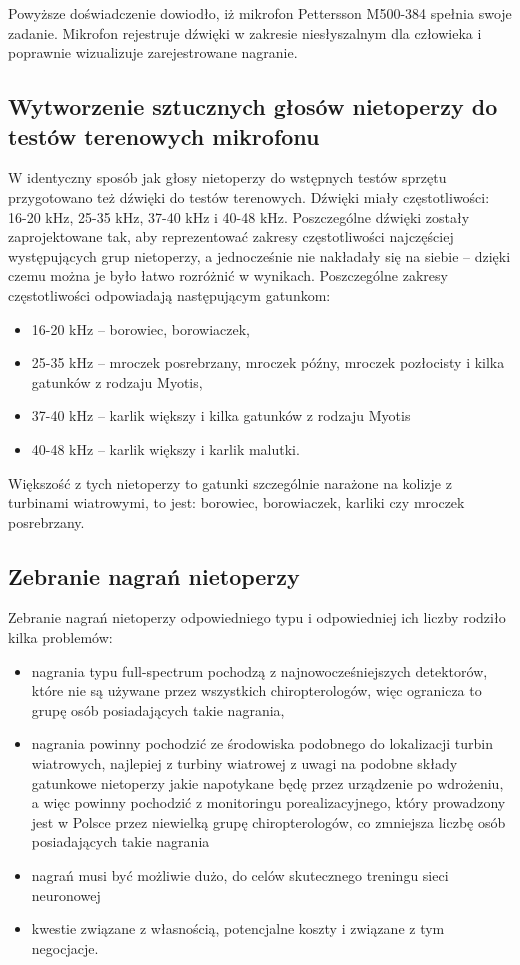 \documentclass{sprz}
\begin{document}
Powyższe doświadczenie dowiodło, iż mikrofon Pettersson M500-384 spełnia swoje zadanie. Mikrofon rejestruje dźwięki w zakresie niesłyszalnym dla człowieka i poprawnie wizualizuje zarejestrowane nagranie.

\subsection{Wytworzenie sztucznych głosów nietoperzy do testów terenowych mikrofonu}
W identyczny sposób jak głosy nietoperzy do wstępnych testów sprzętu przygotowano też dźwięki do testów terenowych. Dźwięki miały częstotliwości: 16-20 kHz, 25-35 kHz, 37-40 kHz i 40-48 kHz. Poszczególne dźwięki zostały zaprojektowane tak, aby reprezentować zakresy częstotliwości najczęściej występujących grup nietoperzy, a jednocześnie nie nakładały się na siebie – dzięki czemu można je było łatwo rozróżnić w wynikach. Poszczególne zakresy częstotliwości odpowiadają następującym gatunkom:

\begin{itemize}
  \item{16-20 kHz – borowiec, borowiaczek,}
  \item{25-35 kHz – mroczek posrebrzany, mroczek późny, mroczek pozłocisty i kilka gatunków z rodzaju Myotis,}
  \item{37-40 kHz – karlik większy i kilka gatunków z rodzaju Myotis}
  \item{40-48 kHz – karlik większy i karlik malutki.}
\end{itemize}

Większość z tych nietoperzy to gatunki szczególnie narażone na kolizje z turbinami wiatrowymi, to jest: borowiec, borowiaczek, karliki czy mroczek posrebrzany.

\subsection{Zebranie nagrań nietoperzy}
Zebranie nagrań nietoperzy odpowiedniego typu i odpowiedniej ich liczby rodziło kilka problemów:
\begin{itemize}
  \item{nagrania typu full-spectrum pochodzą z najnowocześniejszych detektorów, które nie są używane przez wszystkich chiropterologów, więc ogranicza to grupę osób posiadających takie nagrania,}
  \item{nagrania powinny pochodzić ze środowiska podobnego do lokalizacji turbin wiatrowych, najlepiej z turbiny wiatrowej z uwagi na podobne składy gatunkowe nietoperzy jakie napotykane będę przez urządzenie po wdrożeniu, a więc powinny pochodzić z monitoringu porealizacyjnego, który prowadzony jest w Polsce przez niewielką grupę chiropterologów, co zmniejsza liczbę osób posiadających takie nagrania}
  \item{nagrań musi być możliwie dużo, do celów skutecznego treningu sieci neuronowej}
  \item{kwestie związane z własnością, potencjalne koszty i związane z tym negocjacje.}
\end{itemize}
\end{document}
